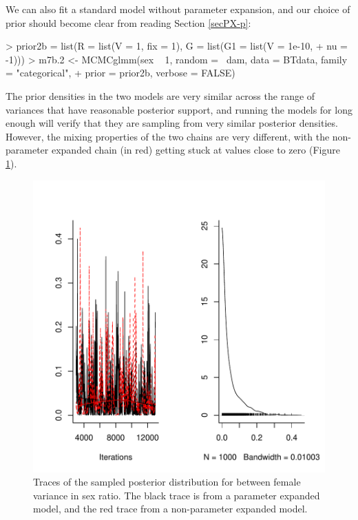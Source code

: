 \documentclass{article}
\begin{document}
We can also fit a standard model without parameter expansion, and our choice of prior should become clear from reading Section \ref{secPX-p}:

\begin{Schunk}
\begin{Sinput}
> prior2b = list(R = list(V = 1, fix = 1), G = list(G1 = list(V = 1e-10, 
+     nu = -1)))
> m7b.2 <- MCMCglmm(sex ~ 1, random = ~dam, data = BTdata, family = "categorical", 
+     prior = prior2b, verbose = FALSE)
\end{Sinput}
\end{Schunk}

The prior densities in the two models are very similar across the range of variances that have reasonable posterior support, and running the models for long enough will verify that they are sampling from very similar posterior densities. However, the mixing properties of the two chains are very different, with the non-parameter expanded chain (in red) getting stuck at values close to zero (Figure \ref{sexratio-fig}).\\


\begin{figure}[!h]
\begin{center}
\includegraphics{Lecture8-004}
\end{center}
\caption{Traces of the sampled posterior distribution for between female variance in sex ratio. The black trace is from a parameter expanded model, and the red trace from a non-parameter expanded model.}
\label{sexratio-fig}
\end{figure}
\end{document}
